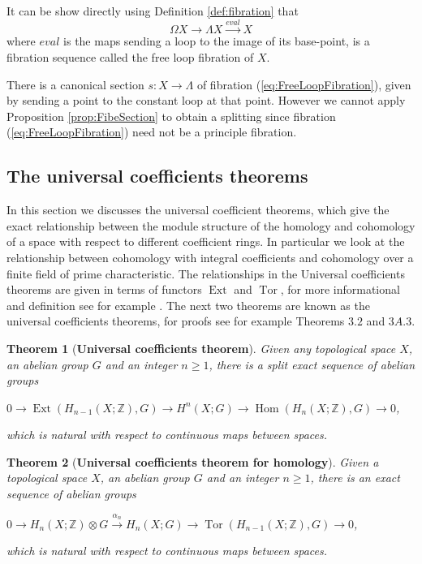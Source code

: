 \documentclass{article}
\theoremstyle{plain}
\newtheorem{thm}{Theorem}[section]
\theoremstyle{definition}
\numberwithin{thm}{section}
\begin{document}
		It can be show directly using Definition \ref{def:fibration} that 
		\begin{equation}\label{eq:FreeLoopFibration}
			\Omega X \to \Lambda X \xrightarrow{eval} X 
		\end{equation}
		where $eval$ is the maps sending a loop to the image of its base-point, is a fibration sequence called the free loop fibration of $X$.
		
		There is a canonical section $s \colon X \to \Lambda$ of fibration (\ref{eq:FreeLoopFibration}), given by sending a point to the constant loop at that point.
		However we cannot apply Proposition \ref{prop:FibeSection}
		to obtain a splitting since fibration (\ref{eq:FreeLoopFibration}) need not be a principle fibration.
		
	\subsection{The universal coefficients theorems}\label{UniversalCoefficients}
	
		In this section we discusses the universal coefficient theorems,
		which give the exact relationship between the module structure of the homology and cohomology of a space with respect to different coefficient rings.
		In particular we look at the relationship between cohomology with integral coefficients and cohomology over a finite field of prime characteristic.
		The relationships in the Universal coefficients theorems are given in terms of functors $\operatorname{Ext}$ and $\operatorname{Tor}$,
		for more informational and definition see for example \cite[Chapter 7]{rotman}.
		The next two theorems are known as the universal coefficients theorems,
		for proofs see for example \cite[\S $3.1$ and $3.A$]{hatcher} Theorems $3.2$ and $3A.3$.
		
		\begin{thm}[{\bf Universal coefficients theorem}]\label{thm:uct}
			Given any topological space $X$, an abelian group $G$ and an integer $n \geq 1$,
			there is a split exact sequence of abelian groups
			\begin{center}
					$0 \to \operatorname{Ext}(H_{n-1}(X;\mathbb{Z}),G) \to H^{n}(X;G) \to \operatorname{Hom}(H_{n}(X;\mathbb{Z}),G) \to 0$,
			\end{center}
			which is natural with respect to continuous maps between spaces.
		\end{thm}
		
		\begin{thm}[{\bf Universal coefficients theorem for homology}]\label{thm:ucth}
			Given a topological space $X$, an abelian group $G$ and an integer $n \geq 1$,
			there is an exact sequence of abelian groups
			\begin{center}
					$0 \to H_{n}(X;\mathbb{Z}) \otimes G \xrightarrow{\alpha_{n}} H_{n}(X;G) \to \operatorname{Tor}(H_{n-1}(X;\mathbb{Z}),G) \to 0$,
			\end{center}
			which is natural with respect to continuous maps between spaces.
		\end{thm}
	
\end{document}
